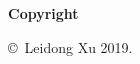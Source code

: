 
\newpage

\thispagestyle{empty}

\vspace*{0.9cm}

\begin{center}

{\bf \Huge Copyright}

\vspace{1cm}


   \Large\copyright\  Leidong Xu 2019.\\

   \vspace{0.5cm}


\end{center}

